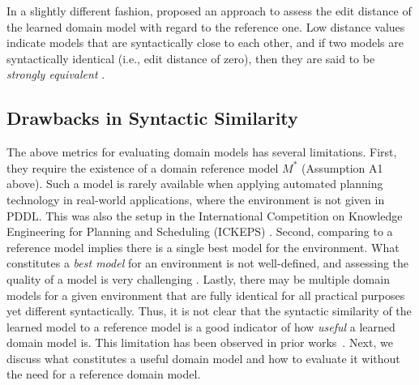 \documentclass{article}
\theoremstyle{definition}
\theoremstyle{remark}
\newcommand{\realm}{{\ensuremath{M^*}}\xspace}
\newif\ifaddcomments
\newcommand{\roni}[1]{\ifaddcomments{\textcolor{red}{[Roni: #1]}}\fi}
\newcommand{\mauro}[1]{\ifaddcomments{\textcolor{green}{[Mauro: #1]}}\fi}
\begin{document}


In a slightly different fashion, \cite{chrpa2023comparing} proposed an approach to assess the edit distance of the learned domain model with regard to the reference one. Low distance values indicate models that are syntactically close to each other, and if two models are syntactically identical (i.e., edit distance of zero), then they are said to be \textit{strongly equivalent} \citep{chrpa2023comparing}.



\subsection{Drawbacks in Syntactic Similarity}
The above metrics for evaluating domain models has several limitations. 
First, they require the existence of a domain reference model $\realm$ (Assumption A1 above). Such a model is rarely available when applying automated planning technology in real-world applications, where the environment is not given in PDDL. 
This was also the setup in the International Competition on Knowledge Engineering for Planning and Scheduling (ICKEPS) \citep{DBLP:journals/aim/ChrpaMVV17}. 
Second, comparing to a reference model implies there is a single best model for the environment. 
What constitutes a \emph{best model} for an environment is not well-defined, and assessing the quality of a model is very challenging \citep{DBLP:conf/kcap/McCluskeyVV17}. 
Lastly, there may be multiple domain models for a given environment that are fully identical for all practical purposes yet different syntactically. 
Thus, it is not clear that the syntactic similarity of the learned model to a reference model is a good indicator of how \emph{useful} a learned domain model is. This limitation has been observed in prior works~\citep{aineto2019learning,juba2021safe,mordoch2024safe}.
Next, we discuss what constitutes a useful domain model and how to evaluate it without the need for a reference domain model.
\end{document}
